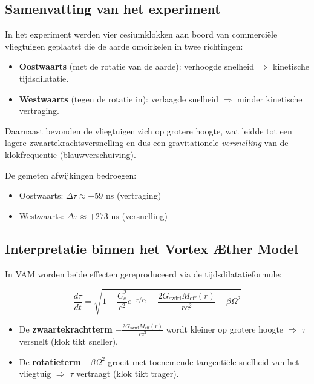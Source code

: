 \subsection{Samenvatting van het experiment}

In het experiment werden vier cesiumklokken aan boord van commerciële vliegtuigen geplaatst die de aarde omcirkelen in twee richtingen:

\begin{itemize}
    \item \textbf{Oostwaarts} (met de rotatie van de aarde): verhoogde snelheid $\Rightarrow$ kinetische tijdsdilatatie.
    \item \textbf{Westwaarts} (tegen de rotatie in): verlaagde snelheid $\Rightarrow$ minder kinetische vertraging.
\end{itemize}

Daarnaast bevonden de vliegtuigen zich op grotere hoogte, wat leidde tot een lagere zwaartekrachtsversnelling en dus een gravitationele \emph{versnelling} van de klokfrequentie (blauwverschuiving).

De gemeten afwijkingen bedroegen:

\begin{itemize}
    \item Oostwaarts: $\Delta\tau \approx -59$ ns (vertraging)
    \item Westwaarts: $\Delta\tau \approx +273$ ns (versnelling)
\end{itemize}

\subsection{Interpretatie binnen het Vortex Æther Model}

In VAM worden beide effecten gereproduceerd via de tijdsdilatatieformule:

\begin{equation}
\frac{d\tau}{dt} = \sqrt{1 - \frac{C_e^2}{c^2} e^{-r/r_c} - \frac{2G_{\text{swirl}} M_{\text{eff}}(r)}{rc^2} - \beta \Omega^2}
\end{equation}

\begin{itemize}
    \item De \textbf{zwaartekrachtterm} $- \frac{2G_{\text{swirl}} M_{\text{eff}}(r)}{rc^2}$ wordt kleiner op grotere hoogte $\Rightarrow$ $\tau$ versnelt (klok tikt sneller).
    \item De \textbf{rotatieterm} $-\beta \Omega^2$ groeit met toenemende tangentiële snelheid van het vliegtuig $\Rightarrow$ $\tau$ vertraagt (klok tikt trager).
\end{itemize}

